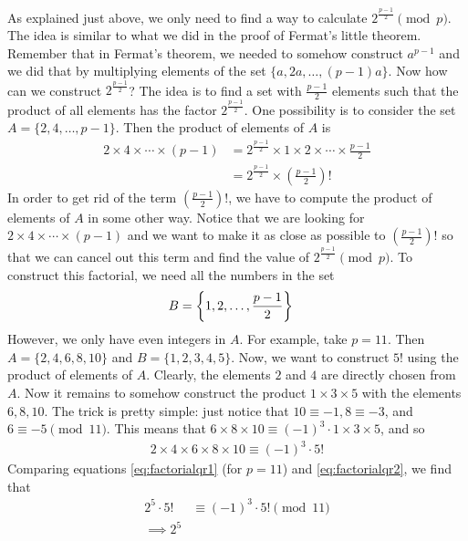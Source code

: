 \begin{solution}
	As explained just above, we only need to find a way to calculate $2^\frac{p-1}{2} \pmod p$. The idea is similar to what we did in the proof of Fermat's little theorem. Remember that in Fermat's theorem, we needed to somehow construct $a^{p-1}$ and we did that by multiplying elements of the set $\{a,2a,\ldots,(p-1)a\}$. Now how can we construct $2^\frac{p-1}{2}$? The idea is to find a set with  $\frac{p-1}{2}$ elements such that the product of all elements has the factor $2^\frac{p-1}{2}$. One possibility is to consider the set $A=\{2, 4, \ldots, p-1\}$. Then the product of elements of $A$ is
	\begin{align}\label{eq:factorialqr1}
		2 \times 4 \times \cdots \times (p-1) &= 2^\frac{p-1}{2} \times 1 \times 2 \times \cdots \times \frac{p-1}{2} \nonumber\\
		& = 2^\frac{p-1}{2} \times \left(\frac{p-1}{2}\right)!
	\end{align}
	In order to get rid of the term $ \left(\frac{p-1}{2}\right)!$, we have to compute the product of elements of $A$ in some other way. Notice that we are looking for $2 \times 4 \times \cdots \times (p-1)$ and we want to make it as close as possible to $ \left(\frac{p-1}{2}\right)!$ so that we can cancel out this term and find the value of $2^\frac{p-1}{2} \pmod p$. To construct this factorial, we need all the numbers in the set
		\begin{align*}
			B
				& = \left\{1, 2, \ldots, \frac{p-1}{2}\right\}
		\end{align*}
	However, we only have even integers in $A$. For example, take $p=11$. Then $A=\{2,4,6,8,10\}$ and $B=\{1,2,3,4,5\}$. Now, we want to construct $5!$ using the product of elements of $A$. Clearly, the elements $2$ and $4$ are directly chosen from $A$. Now it remains to somehow construct the product $1\times 3 \times 5$ with the elements $6,8,10$. The trick is pretty simple: just notice that $10 \equiv -1, 8 \equiv -3$, and $6 \equiv -5 \pmod{11}$. This means that $ 6 \times 8 \times 10 \equiv (-1)^3  \cdot 1 \times 3 \times 5$, and so
	\begin{align}\label{eq:factorialqr2}
	2 \times 4 \times 6 \times 8 \times 10 \equiv (-1)^3 \cdot 5!
	\end{align}
	Comparing equations \eqref{eq:factorialqr1} (for $p=11$) and \eqref{eq:factorialqr2}, we find that
	\begin{align*}
	2^5 \cdot 5!
		& \equiv (-1)^3 \cdot 5! \pmod{11}\\
	\implies 2^5

\end{align*}
\end{solution}

